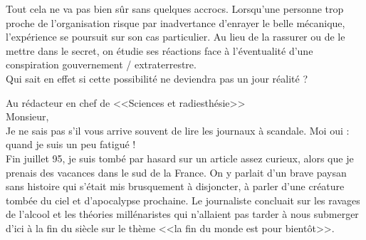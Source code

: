 \documentclass[11pt,twoside,a4paper]{article}
\begin{document}
\begin{multicols*}{2}
Tout cela ne va pas bien s{\^u}r sans quelques accrocs. Lorsqu'une personne trop proche de l'organisation risque par inadvertance d'enrayer le belle m{\'e}canique, l'exp{\'e}rience se poursuit sur son cas particulier. Au lieu de la rassurer ou de le mettre dans le secret, on {\'e}tudie ses r{\'e}actions face {\`a} l'{\'e}ventualit{\'e} d'une conspiration gouvernement / extraterrestre. ~\\

Qui sait en effet si cette possibilit{\'e} ne deviendra pas un jour r{\'e}alit{\'e} ? ~\\

\end{multicols*}

\begin{minipage}[ht]{0.75\textwidth}
	\begin{cursive}	\footnotesize %
		Au r{\'e}dacteur en chef de <<Sciences et radiesth{\'e}sie>>~\\

Monsieur, ~\\

Je ne sais pas s'il vous arrive souvent de lire les journaux {\`a} scandale. Moi oui : quand je suis un peu fatigu{\'e} !~\\

Fin juillet 95, je suis tomb{\'e} par hasard sur un article assez curieux, alors que je prenais des vacances dans le sud de la France. On y parlait d'un brave paysan sans histoire qui s'{\'e}tait mis brusquement {\`a} disjoncter, {\`a} parler d'une cr{\'e}ature tomb{\'e}e du ciel et d'apocalypse prochaine. Le journaliste concluait sur les ravages de l'alcool et les th{\'e}ories mill{\'e}naristes qui n'allaient pas tarder {\`a} nous submerger d'ici {\`a} la fin du si{\`e}cle sur le th{\`e}me <<la fin du monde est pour bient{\^o}t>>. ~\\ 


\end{cursive}
\end{minipage}
\end{document}
